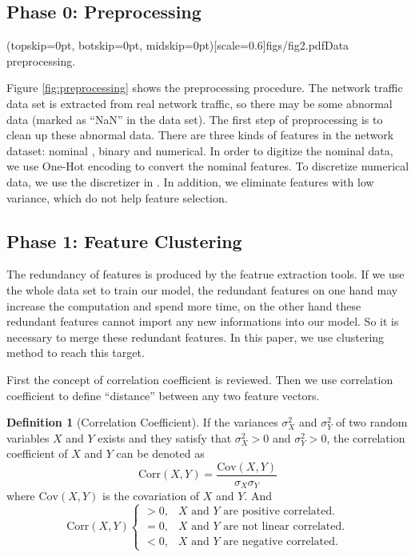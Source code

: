 \documentclass{ieeeaccess}
\theoremstyle{definition}
\newtheorem{defn}{Definition}
\begin{document}
\subsection{Phase 0: Preprocessing}

\Figure[!htpb](topskip=0pt, botskip=0pt, midskip=0pt)[scale=0.6]{figs/fig2.pdf}{Data preprocessing. \label{fig:preprocessing}}

Figure \ref{fig:preprocessing} shows the preprocessing procedure. The network traffic data set is extracted from real network traffic, so there may be some abnormal data (marked as ``NaN'' in the data set). The first step of preprocessing is to clean up these abnormal data. There are three kinds of features in the network dataset: nominal , binary and numerical. In order to digitize the nominal data, we use One-Hot encoding to convert the nominal features. To discretize numerical data, we use the discretizer in \cite{Mazumder2012}. In addition, we eliminate features with low variance, which do not help feature selection.

\subsection{Phase 1: Feature Clustering}

The redundancy of features is produced by the featrue extraction tools. If we use the whole data set to train our model, the redundant features on one hand may increase the computation and spend more time, on the other hand these redundant features cannot import any new informations into our model. So it is necessary to merge these redundant features. In this paper, we use clustering method to reach this target.

First the concept of correlation coefficient is reviewed. Then we use correlation coefficient to define ``distance'' between any two feature vectors. 

\begin{defn}[Correlation Coefficient]
    If the variances $\sigma^2_X$ and $\sigma_Y^2$ of two random variables $X$ and $Y$ exists and they satisfy that $\sigma^2_X > 0$ and $\sigma^2_Y > 0$, the correlation coefficient of $X$ and $Y$ can be denoted as
    \begin{equation}
        \text{Corr}(X, Y) = \frac{\text{Cov}(X, Y)}{\sigma_X \sigma_Y}
    \end{equation}
    where $\text{Cov}(X, Y)$ is the covariation of $X$ and $Y$. And
    $$\text{Corr}(X, Y) 
    \begin{cases}
    > 0, & X \text{ and } Y \text{ are positive correlated.}\\
    = 0, & X \text{ and } Y \text{ are not linear correlated.} \\
    < 0, & X \text{ and } Y \text{ are negative correlated.}
    \end{cases}$$
\end{defn}
\end{document}
